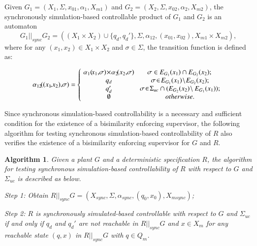 \documentclass[preprint,authoryear,12pt]{elsarticle}
\newtheorem{Algorithm}{Algorithm}
\begin{document}
\begin{Definition}
Given $G_1 =(X_1,\Sigma,x_{01},\alpha_1, X_{m1})$ and $G_2
=(X_2,\Sigma,x_{02},\alpha_2,X_{m2})$, the synchronously
simulation-based controllable product of $G_1$ and $G_2$ is an
automaton
\[
G_1 ||_{sync} G_2 = ( (X_1 \times X_2) \cup \{q_d, q_d'\}, \Sigma,
\alpha_{12}, (x_{01}, x_{02}), X_{m1} \times X_{m2}),
\]
where for any $(x_1, x_2) \in X_1 \times X_2$ and $\sigma \in
\Sigma$, the transition function is defined as:

\[
\alpha_{12}\!((x_1\!, \!x_2),\!\sigma) = \left\{
{\begin{array}{*{20}c}
   \!\alpha_1(\!x_1, \!\sigma) \! \times\! \alpha_2\!(x_2,\! \sigma) \! & \! {\sigma \in E_{G_1}(x_1)\cap E_{G_2}(x_2) };  \\
   q_d & {\sigma \! \in \! E_{G_1}(x_1)\! \setminus \! E_{G_2}(x_2)};  \\
   q_d' & {\sigma \! \in \! \Sigma_{uc}\cap(E_{G_2}(x_2)\! \setminus E_{G_1}(x_1))}; \\
\emptyset & {otherwise}. \\
\end{array}} \right.
\]
\end{Definition}

Since synchronous simulation-based controllability is a necessary
and sufficient condition for the existence of a bisimilarity
enforcing supervisor, the following algorithm for testing
synchronous simulation-based controllability of $R$ also verifies
the existence of a bisimilarity enforcing supervisor for $G$ and
$R$.



\begin{Algorithm}\label{algsync}
Given a plant $G$ and a deterministic specification $R$, the
algorithm for testing synchronous simulation-based controllability
of $R$ with respect to $G$ and $\Sigma_{uc}$ is described as
below.

Step 1: Obtain $ R ||_{sync} G=(X_{sync}, \Sigma, \alpha_{sync},
(q_0, x_0), X_{msync})$;

Step 2: $R$ is synchronously simulated-based controllable with
respect to $G$ and $\Sigma_{uc}$ if and only if $q_d$ and $q_d'$
are not reachable in $R||_{sync} G$ and $x \in X_{m}$ for any
reachable state $(q, x)$ in $R||_{sync} G$ with $q \in Q_{m}$.
\end{Algorithm}
\end{document}
